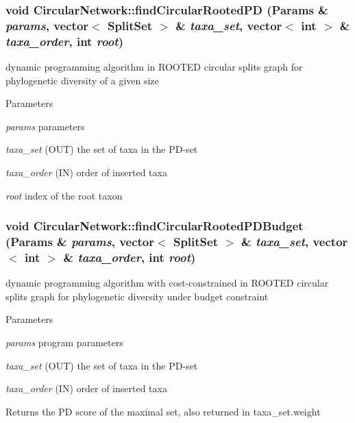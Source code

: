 \hypertarget{classCircularNetwork_af1ee858ebbe97abd3296cad55590f24a}{
\subsubsection[{findCircularRootedPD}]{\setlength{\rightskip}{0pt plus 5cm}void CircularNetwork::findCircularRootedPD ({\bf Params} \& {\em params}, \/  vector$<$ {\bf SplitSet} $>$ \& {\em taxa\_\-set}, \/  vector$<$ int $>$ \& {\em taxa\_\-order}, \/  int {\em root})}}
\label{classCircularNetwork_af1ee858ebbe97abd3296cad55590f24a}
dynamic programming algorithm in ROOTED circular splits graph for phylogenetic diversity of a given size 
\begin{DoxyParams}{Parameters}
\item[{\em params}]parameters \item[{\em taxa\_\-set}](OUT) the set of taxa in the PD-\/set \item[{\em taxa\_\-order}](IN) order of inserted taxa \item[{\em root}]index of the root taxon \end{DoxyParams}
\hypertarget{classCircularNetwork_ae661db891b7746f63444cb221df89e68}{
\subsubsection[{findCircularRootedPDBudget}]{\setlength{\rightskip}{0pt plus 5cm}void CircularNetwork::findCircularRootedPDBudget ({\bf Params} \& {\em params}, \/  vector$<$ {\bf SplitSet} $>$ \& {\em taxa\_\-set}, \/  vector$<$ int $>$ \& {\em taxa\_\-order}, \/  int {\em root})}}
\label{classCircularNetwork_ae661db891b7746f63444cb221df89e68}
dynamic programming algorithm with cost-\/constrained in ROOTED circular splits graph for phylogenetic diversity under budget constraint 
\begin{DoxyParams}{Parameters}
\item[{\em params}]program parameters \item[{\em taxa\_\-set}](OUT) the set of taxa in the PD-\/set \item[{\em taxa\_\-order}](IN) order of inserted taxa \end{DoxyParams}
\begin{DoxyReturn}{Returns}
the PD score of the maximal set, also returned in taxa\_\-set.weight 
\end{DoxyReturn}

